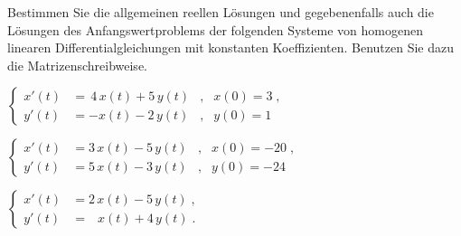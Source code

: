 {
Bestimmen Sie die allgemeinen reellen Lösungen und gegebenenfalls auch die Lösungen des Anfangswertproblems der folgenden Systeme von homogenen linearen Differentialgleichungen mit konstanten Koeffizienten. Benutzen Sie dazu die Matrizenschreibweise.
 
\begin{iii}
\item $ \left\{\begin{array}{rlll}
x'(t) & =\,4\,x(t)+5\,y(t) & , & x(0)=3\;, \\ 
y'(t) & =-x(t)-2\,y(t) & , & y(0)=1\;
\end{array}\right.$
\item $ \left\{\begin{array}{rlll}
x'(t) & =3\,x(t)-5\,y(t) & , & x(0)=-20\;, \\ 
y'(t) & =5\,x(t)-3\,y(t) & , & y(0)=-24\;
\end{array}\right.$
\item $ \left\{\begin{array}{rlll}
x'(t) & =2\,x(t)-5\,y(t)\;, \\ 
y'(t) & =\;\;\,x(t)+4\,y(t)\;.
\end{array}\right.$
\end{iii}
}


